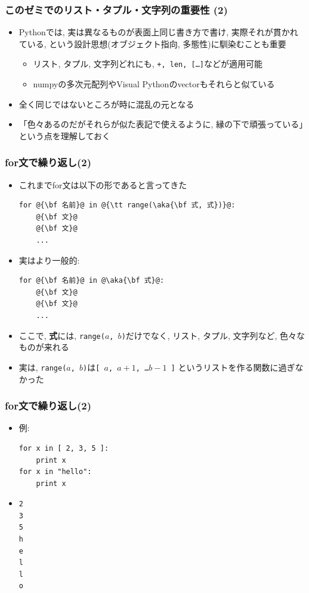 \documentclass[10pt,dvipdfmx]{beamer}
\newcommand{\ao}[1]{{\color{blue}#1}}
\newcommand{\aka}[1]{{\color{red}#1}}
\begin{document}
\begin{frame}[fragile]
\frametitle{このゼミでのリスト・タプル・文字列の重要性 (2)}
\begin{itemize}
\item Pythonでは, \ao{実は異なるものが表面上同じ書き方で書け,}
  実際それが貫かれている, 
  という設計思想(オブジェクト指向, 多態性)に馴染むことも重要
  \begin{itemize}
  \item リスト, タプル, 文字列どれにも, 
    {\tt +, len, [\ldots]}などが適用可能
  \item numpyの多次元配列やVisual Pythonのvectorもそれらと似ている
  \end{itemize}
\item 全く同じではないところが時に混乱の元となる
\item 「色々あるのだがそれらが似た表記で使えるように,
  縁の下で頑張っている」という点を理解しておく
\end{itemize}
\end{frame}


\begin{frame}[fragile]
\frametitle{for文で繰り返し(2)}
\begin{itemize}
\item これまでfor文は以下の形であると言ってきた
\begin{lstlisting}
for @{\bf 名前}@ in @{\tt range(\aka{\bf 式, 式})}@:
    @{\bf 文}@
    @{\bf 文}@
    ...
\end{lstlisting}
\item 実はより一般的:
\begin{lstlisting}
for @{\bf 名前}@ in @\aka{\bf 式}@:
    @{\bf 文}@
    @{\bf 文}@
    ...
\end{lstlisting}
\item ここで, \aka{\bf 式}には, 
  {\tt range($a$, $b$)}だけでなく,
  リスト, タプル, 文字列など,
  色々なものが来れる
\item 実は, 
  {\tt range($a$, $b$)}は{\tt [ $a$, $a+1$, \ldots $b-1$ ]}
  というリストを作る関数に過ぎなかった
\end{itemize}
\end{frame}

\begin{frame}[fragile]
\frametitle{for文で繰り返し(2)}
\begin{itemize}
\item 例:
\begin{lstlisting}
for x in [ 2, 3, 5 ]:
    print x
for x in "hello":
    print x
\end{lstlisting}
\item 
\begin{lstlisting}
2
3
5
h
e
l
l
o
\end{lstlisting}
\end{itemize}
\end{frame}
\end{document}
